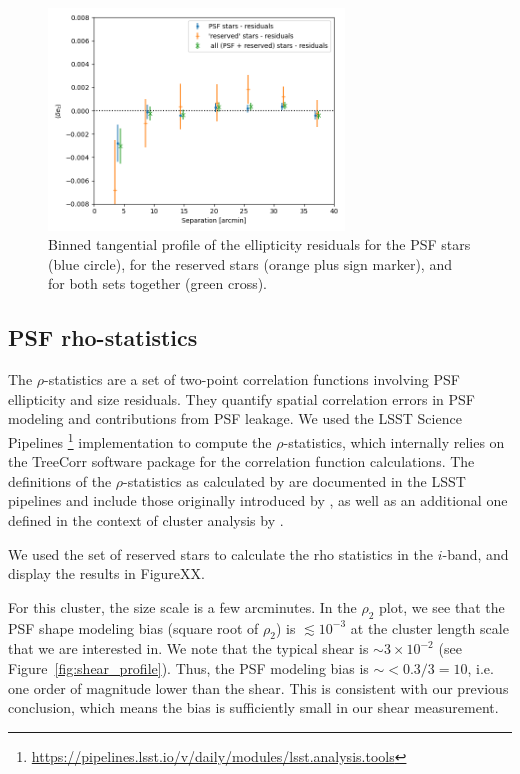 \documentclass[SE,lsstdraft,authoryear,toc]{lsstdoc}
\begin{document}
\begin{figure}
\centering
\includegraphics[width=0.7\textwidth]{Figures/residual_tan_profile_CLMM.png}
\caption{Binned tangential profile of the ellipticity residuals for the PSF stars (blue circle), for the reserved stars (orange plus sign marker), and for both sets together (green cross).\label{fig:res_profile}}
\end{figure}


\subsection{PSF rho-statistics}
The $\rho$-statistics \citep{2010MNRAS.404..350R, 2016MNRAS.460.2245J} are a set of two-point correlation functions involving PSF ellipticity and size residuals. They quantify spatial correlation errors in PSF modeling and contributions from PSF leakage. We used the LSST Science Pipelines \footnote{\url{https://pipelines.lsst.io/v/daily/modules/lsst.analysis.tools}} implementation to compute the $\rho$-statistics, which internally relies on the TreeCorr software package \citep{2015ascl.soft08007J} for the correlation function calculations. The definitions of the $\rho$-statistics as calculated by  are documented in the LSST pipelines and include those originally introduced by \citet{2010MNRAS.404..350R, 2016MNRAS.460.2245J}, as well as an additional one defined in the context of cluster analysis by \citet{2015MNRAS.449.2219M}.

We used the set of reserved stars to calculate the rho statistics in the $i$-band, and display the results in FigureXX.

For this cluster, the size scale is a few arcminutes. In the $\rho_2$ plot, we see that the PSF shape modeling bias (square root of $\rho_2$) is $\lesssim 10^{-3}$ at the cluster length scale that we are interested in. We note that the typical shear is $\sim 3\times10^{-2}$ (see Figure~\ref{fig:shear_profile}). Thus, the PSF modeling bias is $\sim <0.3/3=10$, i.e. one order of magnitude lower than the shear. This is consistent with our previous conclusion, which means the bias is sufficiently small in our shear measurement.
\end{document}
